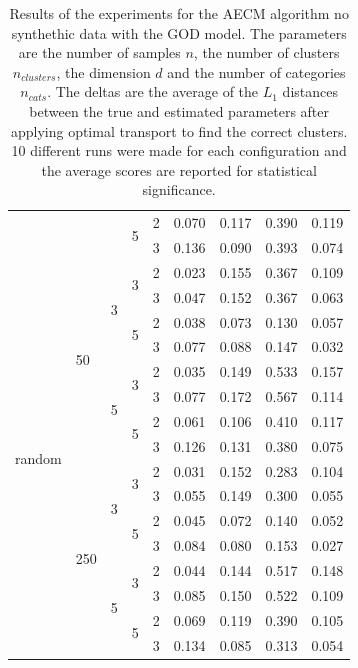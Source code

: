 \begin{table}[H]
\begin{minipage}{.48\columnwidth}
\begin{adjustbox}{width=\columnwidth}
\begin{tabular}{lllllrrrr}
\cline{4-9}
 &  &  & \multirow[t]{2}{*}{5} & 2 & 0.070 & 0.117 & 0.390 & 0.119 \\
 &  &  &  & 3 & 0.136 & 0.090 & 0.393 & 0.074 \\
\cline{1-9} \cline{2-9} \cline{3-9} \cline{4-9}
\multirow[t]{16}{*}{random} & \multirow[t]{8}{*}{50} & \multirow[t]{4}{*}{3} & \multirow[t]{2}{*}{3} & 2 & 0.023 & 0.155 & 0.367 & 0.109 \\
 &  &  &  & 3 & 0.047 & 0.152 & 0.367 & 0.063 \\
\cline{4-9}
 &  &  & \multirow[t]{2}{*}{5} & 2 & 0.038 & 0.073 & 0.130 & 0.057 \\
 &  &  &  & 3 & 0.077 & 0.088 & 0.147 & 0.032 \\
\cline{3-9} \cline{4-9}
 &  & \multirow[t]{4}{*}{5} & \multirow[t]{2}{*}{3} & 2 & 0.035 & 0.149 & 0.533 & 0.157 \\
 &  &  &  & 3 & 0.077 & 0.172 & 0.567 & 0.114 \\
\cline{4-9}
 &  &  & \multirow[t]{2}{*}{5} & 2 & 0.061 & 0.106 & 0.410 & 0.117 \\
 &  &  &  & 3 & 0.126 & 0.131 & 0.380 & 0.075 \\
\cline{2-9} \cline{3-9} \cline{4-9}
 & \multirow[t]{8}{*}{250} & \multirow[t]{4}{*}{3} & \multirow[t]{2}{*}{3} & 2 & 0.031 & 0.152 & 0.283 & 0.104 \\
 &  &  &  & 3 & 0.055 & 0.149 & 0.300 & 0.055 \\
\cline{4-9}
 &  &  & \multirow[t]{2}{*}{5} & 2 & 0.045 & 0.072 & 0.140 & 0.052 \\
 &  &  &  & 3 & 0.084 & 0.080 & 0.153 & 0.027 \\
\cline{3-9} \cline{4-9}
 &  & \multirow[t]{4}{*}{5} & \multirow[t]{2}{*}{3} & 2 & 0.044 & 0.144 & 0.517 & 0.148 \\
 &  &  &  & 3 & 0.085 & 0.150 & 0.522 & 0.109 \\
\cline{4-9}
 &  &  & \multirow[t]{2}{*}{5} & 2 & 0.069 & 0.119 & 0.390 & 0.105 \\
 &  &  &  & 3 & 0.134 & 0.085 & 0.313 & 0.054 \\
\cline{1-9} \cline{2-9} \cline{3-9} \cline{4-9}
\bottomrule
\end{tabular}
\end{adjustbox}
\caption{Results of the experiments for the AECM algorithm no synthethic data with the GOD model. The parameters are the number of samples $n$, the number of clusters $n_{clusters}$, the dimension $d$ and the number of categories $n_{cats}$. The deltas are the average of the $L_1$ distances between the true and estimated parameters after applying optimal transport to find the correct clusters. 10 different runs were made for each configuration and the average scores are reported for statistical significance.}

\end{minipage}
\end{table}
